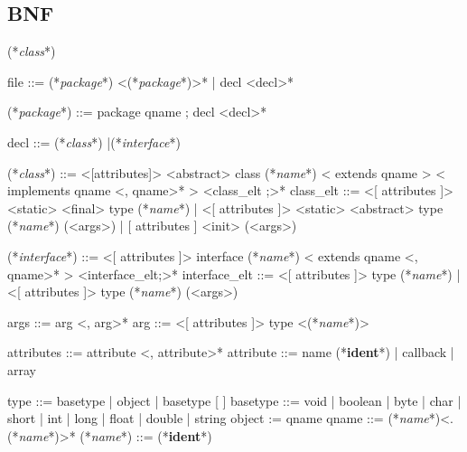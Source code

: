 \documentclass[a4paper, 11pt, notitlepage]{article}
\newcommand{\class}{\ttfamily\textit{class}}
\newcommand{\interface}{\ttfamily\textit{interface}}
\newcommand{\name}{\ttfamily\textit{name}}
\newcommand{\package}{\ttfamily\textit{package}}
\newcommand{\ident}{\footnotesize\textbf{ident}}
\begin{document}
\subsection*{BNF}
\begin{idl}
(*\class*)

file ::= (*\package*) <(*\package*)>*
  	| decl <decl>*
 
(*\package*) ::= package qname ; decl <decl>*

decl ::= (*\class*)
  	|(*\interface*)
 
(*\class*) ::= <[attributes]> <abstract> class (*\name*)
  	  < extends qname >
  	  < implements qname <, qname>* >
  	  { <class_elt ;>* }
class_elt ::= <[ attributes ]> <static> <final> type (*\name*)
            | <[ attributes ]> <static> <abstract> type (*\name*) (<args>)
            | [ attributes ] <init> (<args>)
 
(*\interface*) ::= <[ attributes ]> interface (*\name*)
  	       < extends qname <, qname>* >
  	      { <interface_elt;>* }
interface_elt ::= 
     <[ attributes ]> type (*\name*)
   | <[ attributes ]> type (*\name*) (<args>)
 
args ::= arg <, arg>*
arg ::= <[ attributes ]> type <(*\name*)>
 
attributes ::= 	attribute <, attribute>*
attribute ::= name (*\ident*)
  	    | callback
  	    | array
 
type ::= basetype
       | object
       | basetype [ ]
basetype ::= void
           | boolean
           | byte
           | char
           | short
           | int
           | long
           | float
           | double
           | string
object := qname
qname ::= (*\name*)<.(*\name*)>*
(*\name*) ::= (*\ident*)
\end{idl}

\newpage
\end{document}
